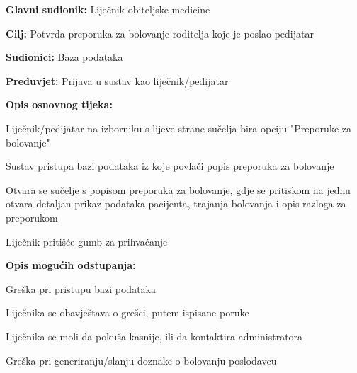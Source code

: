 					\noindent {}
					\begin{packed_item}
						
						\item \textbf{Glavni sudionik: }Liječnik obiteljske medicine
						\item  \textbf{Cilj:} Potvrda preporuka za bolovanje roditelja koje je poslao pedijatar
						\item  \textbf{Sudionici:} Baza podataka
						\item  \textbf{Preduvjet:} Prijava u sustav kao liječnik/pedijatar
						\item  \textbf{Opis osnovnog tijeka:}
						
						\item[] \begin{packed_enum}
							
							\item Liječnik/pedijatar na izborniku s lijeve strane sučelja bira opciju "Preporuke za bolovanje"
							\item Sustav pristupa bazi podataka iz koje povlači popis preporuka za bolovanje
							\item Otvara se sučelje s popisom preporuka za bolovanje, gdje se pritiskom na jednu otvara detaljan prikaz podataka pacijenta, trajanja bolovanja i opis razloga za preporukom
							\item Liječnik pritišće gumb za prihvaćanje
							
						\end{packed_enum}
						
						\item  \textbf{Opis mogućih odstupanja:}
						\item[] \begin{packed_item}
							\item[2.a] Greška pri pristupu bazi podataka
							\item[] \begin{packed_enum}
								
								\item Liječnika se obavještava o grešci, putem ispisane poruke
								\item Liječnika se moli da pokuša kasnije, ili da kontaktira administratora
								
							\end{packed_enum}
							\item[4.a] Greška pri generiranju/slanju doznake o bolovanju poslodavcu
							\item[] \begin{packed_enum}
								

\end{packed_enum}
\end{packed_item}
\end{packed_item}
